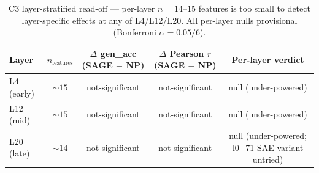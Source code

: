 \begin{table}[t]
\centering
\caption{C3 layer-stratified read-off --- per-layer $n=14$--$15$ features is too small to detect layer-specific effects at any of L4/L12/L20. All per-layer nulls provisional (Bonferroni $\alpha = 0.05/6$).}
\label{tab:c3_layer}
\begin{tabular}{lcccc}
\toprule
Layer & $n_{\text{features}}$ & $\Delta$ gen\_acc (SAGE $-$ NP) & $\Delta$ Pearson $r$ (SAGE $-$ NP) & Per-layer verdict \\
\midrule
L4 (early) & $\sim 15$ & not-significant & not-significant & null (under-powered) \\
L12 (mid) & $\sim 15$ & not-significant & not-significant & null (under-powered) \\
L20 (late) & $\sim 14$ & not-significant & not-significant & null (under-powered; l0\_71 SAE variant untried) \\
\bottomrule
\end{tabular}
\end{table}
